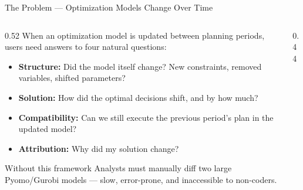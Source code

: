 \documentclass[aspectratio=169,10pt]{beamer}
\begin{document}
\begin{frame}[t]{The Problem — Optimization Models Change Over Time}
\vspace{2pt}
\begin{columns}[T]
  \begin{column}{0.52\textwidth}
    \small
    When an optimization model is updated between planning
    periods, users need answers to four natural questions:
    \vspace{5pt}
    \begin{itemize}\setlength\itemsep{4pt}
      \item \textbf{Structure:} Did the model itself change?
            New constraints, removed variables, shifted parameters?
      \item \textbf{Solution:} How did the optimal decisions shift,
            and by how much?
      \item \textbf{Compatibility:} Can we still execute the previous
            period's plan in the updated model?
      \item \textbf{Attribution:} Why did my solution change?
    \end{itemize}
    \vspace{0pt}
    \begin{alertblock}{Without this framework}
      \small Analysts must manually diff two large Pyomo/Gurobi
      models — slow, error-prone, and inaccessible to non-coders.
    \end{alertblock}
  \end{column}
  \begin{column}{0.44\textwidth}
    \vspace{6pt}
    \begin{center}
    \end{center}
  \end{column}
\end{columns}
\end{frame}
\end{document}
